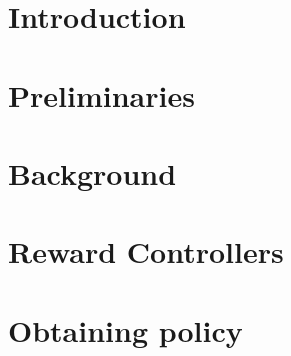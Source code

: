 \documentclass[12pt,twoside]{report}
\theoremstyle{definition}
\theoremstyle{remark}
\begin{document}
	\chapter{Introduction}
	
	
	\chapter{Preliminaries}
	
	
	\chapter{Background}
	
	
	\chapter{Reward Controllers}
	
	
	\chapter{Obtaining policy}
	
	
	
	
	
	

	\newpage
	
	
	
	
	
\end{document}
